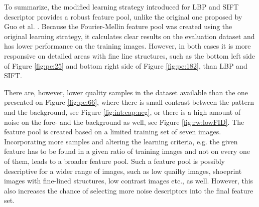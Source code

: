 \documentclass[draft,final]{vutinfth} %
\begin{document}
\par
To summarize, the modified learning strategy introduced for LBP and SIFT descriptor provides a robust feature pool, unlike the original one proposed by Guo et al. \cite{guo2012discriminative}.
Because the Fourier-Mellin feature pool was created using the original learning strategy, it calculates clear results  on the evaluation dataset and has lower performance on the training images.
However, in both cases it is more responsive on detailed areas with fine line structures, such as the bottom left side of Figure \ref{fig:pe:25} and bottom right side of Figure \ref{fig:pe:182}, than LBP and SIFT.
\par
There are, however, lower quality samples in the dataset available than the one presented on Figure  \ref{fig:pe:66}, where there is small contrast between the pattern and the background, see Figure  \ref{fig:int:cap:neg}, or there is a high amount of noise on the fore- and the background as well, see Figure \ref{fig:rw:lowFID}.
The feature pool is created based on a limited training set of seven images.
Incorporating more samples and altering the learning criteria, e.g. the given feature has to be found in a given ratio of training images and not on every one of them, leads to a broader feature pool.
Such a feature pool is possibly descriptive for a wider range of images, such as low quailty images, shoeprint images with fine-lined structures, low contrast images etc., as well.
However, this also increases the chance of selecting more noise descriptors into the final feature set.
\end{document}
